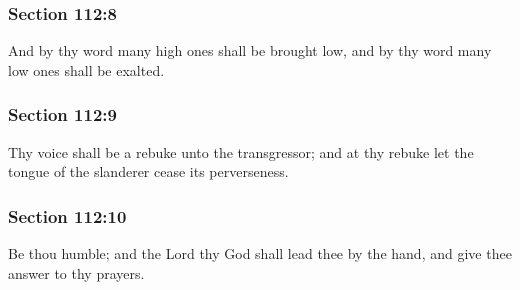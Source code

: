 	\subsubsection{Section 112:8} %
		\label{DC112-8}

		And by thy word many high ones shall be brought low, and by thy word many low ones shall be exalted.


	\subsubsection{Section 112:9} %
		\label{DC112-9}

		Thy voice shall be a rebuke unto the transgressor; and at thy rebuke let the tongue of the slanderer cease its perverseness.


	\subsubsection{Section 112:10} %
		\label{DC112-10}

		Be thou humble; and the Lord thy God shall lead thee by the hand, and give thee answer to thy prayers.


